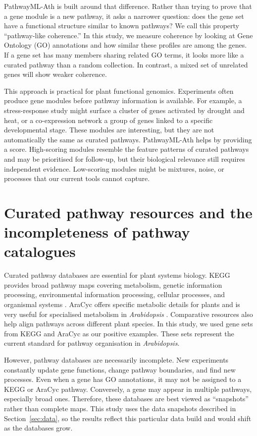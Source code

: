 \documentclass[12pt,letterpaper,oneside,openany]{book}
\begin{document}
PathwayML-Ath is built around that difference. Rather than trying to prove that a gene module is a new pathway, it asks a narrower question: does the gene set have a functional structure similar to known pathways? We call this property ``pathway-like coherence.'' In this study, we measure coherence by looking at Gene Ontology (GO) annotations and how similar these profiles are among the genes. If a gene set has many members sharing related GO terms, it looks more like a curated pathway than a random collection. In contrast, a mixed set of unrelated genes will show weaker coherence.

This approach is practical for plant functional genomics. Experiments often produce gene modules before pathway information is available. For example, a stress-response study might surface a cluster of genes activated by drought and heat, or a co-expression network a group of genes linked to a specific developmental stage. These modules are interesting, but they are not automatically the same as curated pathways. PathwayML-Ath helps by providing a score. High-scoring modules resemble the feature patterns of curated pathways and may be prioritised for follow-up, but their biological relevance still requires independent evidence. Low-scoring modules might be mixtures, noise, or processes that our current tools cannot capture.

\section{Curated pathway resources and the incompleteness of pathway catalogues}
\label{sec:bg_pathway_databases}

Curated pathway databases are essential for plant systems biology. KEGG provides broad pathway maps covering metabolism, genetic information processing, environmental information processing, cellular processes, and organismal systems \citep{kanehisa2023kegg}. AraCyc offers specific metabolic details for plants and is very useful for specialised metabolism in \textit{Arabidopsis} \citep{hawkins2021plant}. Comparative resources also help align pathways across different plant species. In this study, we used gene sets from KEGG and AraCyc as our positive examples. These sets represent the current standard for pathway organisation in \textit{Arabidopsis}.

However, pathway databases are necessarily incomplete. New experiments constantly update gene functions, change pathway boundaries, and find new processes. Even when a gene has GO annotations, it may not be assigned to a KEGG or AraCyc pathway. Conversely, a gene may appear in multiple pathways, especially broad ones. Therefore, these databases are best viewed as ``snapshots'' rather than complete maps. This study uses the data snapshots described in Section~\ref{sec:data}, so the results reflect this particular data build and would shift as the databases grow.
\end{document}
